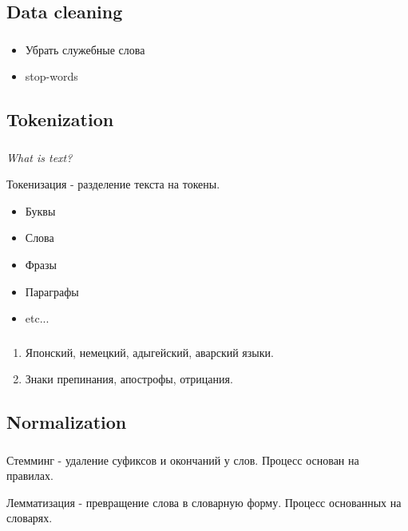 \documentclass[t, 11pt]{beamer}
\begin{document}
	\subsection{Data cleaning} \label{l1.2}
	
	\begin{frame}
	\frametitle{\insertsection}
	\frametitle{\insertsubsection}  
	\begin{itemize}
		\item Убрать служебные слова
		\item stop-words
	\end{itemize}
\end{frame}


	\subsection{Tokenization}

\begin{frame}\label{l2}
	\frametitle{\insertsection}
	\frametitle{\insertsubsection}
	 \emph{What is text?}
	 
	 \vspace{0.5cm}
	 Токенизация - разделение текста на токены. 
	 \begin{itemize}
	 	\item Буквы 
	 	\item Слова 
	 	\item Фразы
	 	\item Параграфы 
	 	\item etc...
	 	\end{itemize}
 	
\end{frame}

\begin{frame}\label{}
	\frametitle{\insertsection}
	\frametitle{\insertsubsection}
 \begin{enumerate}
 	\item Японский, немецкий, адыгейский, аварский языки. 
 	\item Знаки препинания, апострофы, отрицания.
 \end{enumerate}
\end{frame}


	\subsection{Normalization}

\begin{frame}\label{}
	\frametitle{\insertsection}
	\frametitle{\insertsubsection}
	Стемминг - удаление суфиксов и окончаний у слов. Процесс основан на правилах.
	
	\vspace{1cm}
	Лемматизация - превращение слова в словарную форму. Процесс основанных на словарях.
\end{frame}
\end{document}
